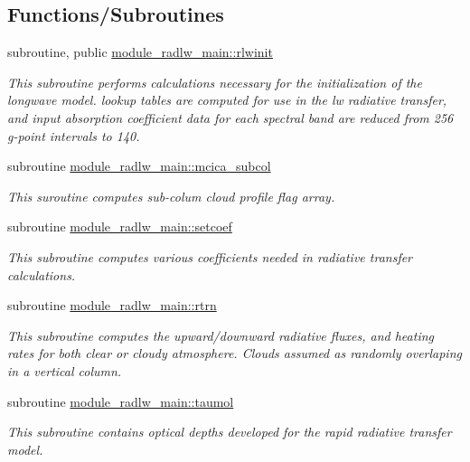 \subsection*{Functions/\+Subroutines}
\begin{DoxyCompactItemize}
\item 
subroutine, public \hyperlink{group__module__radlw__main_ga916dc850de8c1d18ff9bfd6f63b65d30}{module\+\_\+radlw\+\_\+main\+::rlwinit}
\begin{DoxyCompactList}\small\item\em This subroutine performs calculations necessary for the initialization of the longwave model. lookup tables are computed for use in the lw radiative transfer, and input absorption coefficient data for each spectral band are reduced from 256 g-\/point intervals to 140. \end{DoxyCompactList}\item 
subroutine \hyperlink{group__module__radlw__main_ga378846d33b06ea00ba43d9c3b4c3a661}{module\+\_\+radlw\+\_\+main\+::mcica\+\_\+subcol}
\begin{DoxyCompactList}\small\item\em This suroutine computes sub-\/colum cloud profile flag array. \end{DoxyCompactList}\item 
subroutine \hyperlink{group__module__radlw__main_ga503a8d3f064dfb4cd4503ae98711bab8}{module\+\_\+radlw\+\_\+main\+::setcoef}
\begin{DoxyCompactList}\small\item\em This subroutine computes various coefficients needed in radiative transfer calculations. \end{DoxyCompactList}\item 
subroutine \hyperlink{group__module__radlw__main_gaa42d8cb56a431d3693d3db44733c11e3}{module\+\_\+radlw\+\_\+main\+::rtrn}
\begin{DoxyCompactList}\small\item\em This subroutine computes the upward/downward radiative fluxes, and heating rates for both clear or cloudy atmosphere. Clouds assumed as randomly overlaping in a vertical column. \end{DoxyCompactList}\item 
subroutine \hyperlink{group__module__radlw__main_gac2fa8768f0911fed5343f643953c780d}{module\+\_\+radlw\+\_\+main\+::taumol}
\begin{DoxyCompactList}\small\item\em This subroutine contains optical depths developed for the rapid radiative transfer model. \end{DoxyCompactList}\item 

\end{DoxyCompactItemize}
